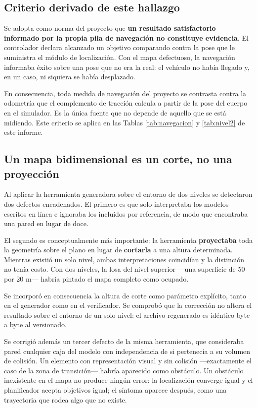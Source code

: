 \documentclass[12pt,letterpaper]{article}
\begin{document}
\subsection{Criterio derivado de este hallazgo}

Se adopta como norma del proyecto que \textbf{un resultado satisfactorio informado por la propia pila de navegación no constituye evidencia}. El controlador declara alcanzado un objetivo comparando contra la pose que le suministra el módulo de localización. Con el mapa defectuoso, la navegación informaba éxito sobre una pose que no era la real: el vehículo no había llegado y, en un caso, ni siquiera se había desplazado.

En consecuencia, toda medida de navegación del proyecto se contrasta contra la odometría que el complemento de tracción calcula a partir de la pose del cuerpo en el simulador. Es la única fuente que no depende de aquello que se está midiendo. Este criterio se aplica en las Tablas \ref{tab:navegacion} y \ref{tab:nivel2} de este informe.

\subsection{Un mapa bidimensional es un corte, no una proyección}
\label{sec:corte}

Al aplicar la herramienta generadora sobre el entorno de dos niveles se detectaron dos defectos encadenados. El primero es que solo interpretaba los modelos escritos en línea e ignoraba los incluidos por referencia, de modo que encontraba una pared en lugar de doce.

El segundo es conceptualmente más importante: la herramienta \textbf{proyectaba} toda la geometría sobre el plano en lugar de \textbf{cortarla} a una altura determinada. Mientras existió un solo nivel, ambas interpretaciones coincidían y la distinción no tenía costo. Con dos niveles, la losa del nivel superior ---una superficie de 50 por 20 m--- habría pintado el mapa completo como ocupado.

Se incorporó en consecuencia la altura de corte como parámetro explícito, tanto en el generador como en el verificador. Se comprobó que la corrección no altera el resultado sobre el entorno de un solo nivel: el archivo regenerado es idéntico byte a byte al versionado.

Se corrigió además un tercer defecto de la misma herramienta, que consideraba pared cualquier caja del modelo con independencia de si pertenecía a su volumen de colisión. Un elemento con representación visual y sin colisión ---exactamente el caso de la zona de transición--- habría aparecido como obstáculo. Un obstáculo inexistente en el mapa no produce ningún error: la localización converge igual y el planificador acepta objetivos igual; el síntoma aparece después, como una trayectoria que rodea algo que no existe.
\end{document}
